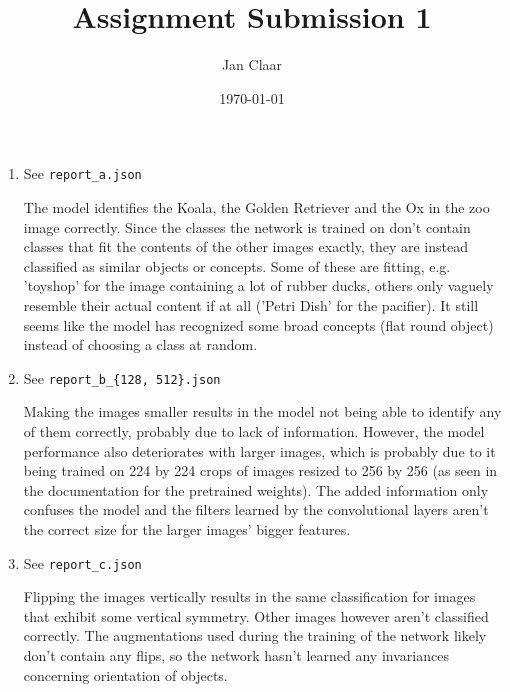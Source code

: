 \documentclass[
    headings=optiontohead,              %
    12pt,                               %
    DIV=13,                             %
    twoside=false,                      %
    open=right,                         %
    BCOR=00mm,                          %
    toc=bibliographynumbered,            %
    parskip=half,                       %
]{scrarticle}
\title{Assignment Submission 1}
\author{Jan Claar}
\date{\today}
\begin{document}
    \head 


    \begin{enumerate}[label=\alph*)]
        \item See \texttt{report\_a.json}

        The model identifies the Koala, the Golden Retriever and the Ox in the zoo image correctly. Since the classes the network is trained on don't contain classes that fit the contents of the other images exactly, they are instead classified as similar objects or concepts. 
        Some of these are fitting, e.g. 'toyshop' for the image containing a lot of rubber ducks, others only vaguely resemble their actual content if at all ('Petri Dish' for the pacifier). It still seems like the model has recognized some broad concepts (flat round object) instead of choosing a class at random. 

        \item See \texttt{report\_b\_\{128, 512\}.json}

        Making the images smaller results in the model not being able to identify any of them correctly, probably due to lack of information.
        However, the model performance also deteriorates with larger images, which is probably due to it being trained on 224 by 224 crops of images resized to 256 by 256 (as seen in the documentation for the pretrained weights). The added information only confuses the model and the filters learned by the convolutional layers aren't the correct size for the larger images' bigger features.

        \item See \texttt{report\_c.json}

        Flipping the images vertically results in the same classification for images that exhibit some vertical symmetry. Other images however aren't classified correctly.
        The augmentations used during the training of the network likely don't contain any flips, so the network hasn't learned any invariances concerning orientation of objects.

    \end{enumerate}
\end{document}
